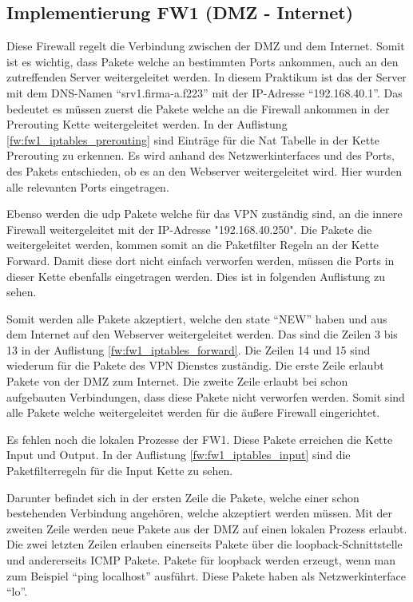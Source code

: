 \subsection{Implementierung FW1 (DMZ - Internet)}
Diese Firewall regelt die Verbindung zwischen der DMZ und dem Internet. Somit ist es wichtig, dass Pakete welche an bestimmten Ports ankommen, auch an den zutreffenden Server weitergeleitet werden. In diesem Praktikum ist das der Server mit dem DNS-Namen "`srv1.firma-a.f223"' mit der IP-Adresse "`192.168.40.1"'. Das bedeutet es müssen zuerst die Pakete welche an die Firewall ankommen in der Prerouting Kette weitergeleitet werden. In der Auflistung \ref{fw:fw1_iptables_prerouting} sind Einträge für die Nat Tabelle in der Kette Prerouting zu erkennen. Es wird anhand des Netzwerkinterfaces und des Ports, des Pakets entschieden, ob es an den Webserver weitergeleitet wird. Hier wurden alle relevanten Ports eingetragen.

Ebenso werden die udp Pakete welche für das VPN zuständig sind, an die innere Firewall weitergeleitet mit der IP-Adresse "192.168.40.250". Die Pakete die weitergeleitet werden, kommen somit an die Paketfilter Regeln an der Kette Forward. Damit diese dort nicht einfach verworfen werden, müssen die Ports in dieser Kette ebenfalls eingetragen werden. Dies ist in folgenden Auflistung zu sehen.

Somit werden alle Pakete akzeptiert, welche den state "`NEW"' haben und aus dem Internet auf den Webserver weitergeleitet werden. Das sind die Zeilen 3 bis 13 in der Auflistung \ref{fw:fw1_iptables_forward}. Die Zeilen 14 und 15 sind wiederum für die Pakete des VPN Dienstes zuständig. Die erste Zeile erlaubt Pakete von der DMZ zum Internet. Die zweite Zeile erlaubt bei schon aufgebauten Verbindungen, dass diese Pakete nicht verworfen werden. Somit sind alle Pakete welche weitergeleitet werden für die äußere Firewall eingerichtet.

Es fehlen noch die lokalen Prozesse der FW1. Diese Pakete erreichen die Kette Input und Output. In der Auflistung \ref{fw:fw1_iptables_input} sind die Paketfilterregeln für die Input Kette zu sehen.

Darunter befindet sich in der ersten Zeile die Pakete, welche einer schon bestehenden Verbindung angehören, welche akzeptiert werden müssen. Mit der zweiten Zeile werden neue Pakete aus der DMZ auf einen lokalen Prozess erlaubt. Die zwei letzten Zeilen erlauben einerseits Pakete über die loopback-Schnittstelle und andererseits ICMP Pakete. Pakete für loopback werden erzeugt, wenn man zum Beispiel "`ping localhost"' ausführt. Diese Pakete haben als Netzwerkinterface "`lo"'.

